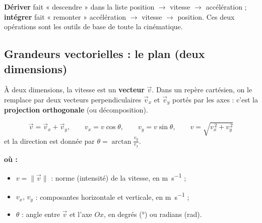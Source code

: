 \documentclass[11pt,a4paper]{article}
\newenvironment{ou}{%
  \par\smallskip\noindent\textbf{où :}\nopagebreak
  \begin{itemize}[leftmargin=1.8em,topsep=2pt,itemsep=1.5pt,parsep=0pt]}%
  {\end{itemize}}
\newcommand{\vv}[1]{\vec{#1}}
\begin{document}
\begin{remarque}
\textbf{Dériver} fait « descendre » dans la liste position $\to$ vitesse $\to$ accélération ;
\textbf{intégrer} fait « remonter » accélération $\to$ vitesse $\to$ position. Ces deux opérations
sont les outils de base de toute la cinématique.
\end{remarque}

\subsection{Grandeurs vectorielles : le plan (deux dimensions)}

À deux dimensions, la vitesse est un \textbf{vecteur} $\vv{v}$. Dans un repère cartésien, on le
remplace par deux vecteurs perpendiculaires $\vv{v}_x$ et $\vv{v}_y$ portés par les axes : c'est
la \textbf{projection orthogonale} (ou décomposition).

\begin{center}
\end{center}

\begin{formule}
\[ \vv{v}=\vv{v}_x+\vv{v}_y,\qquad
   \boxed{v_x=v\cos\theta},\qquad \boxed{v_y=v\sin\theta},\qquad
   \boxed{v=\sqrt{v_x^{\,2}+v_y^{\,2}}} \]
et la direction est donnée par $\displaystyle \theta=\arctan\!\frac{v_y}{v_x}$.
\begin{ou}
  \item $v=\lVert\vv{v}\rVert$ : norme (intensité) de la vitesse, en \si{\metre\per\second} ;
  \item $v_x,\,v_y$ : composantes horizontale et verticale, en \si{\metre\per\second} ;
  \item $\theta$ : angle entre $\vv{v}$ et l'axe $Ox$, en degrés (\si{\degree}) ou radians (\si{\radian}).
\end{ou}
\end{formule}
\end{document}
